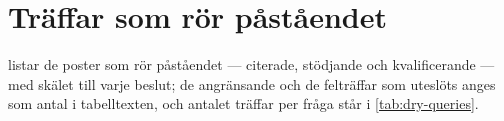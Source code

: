 \section{Träffar som rör påståendet}
\label{sec:dry-traffar}

 listar de poster som rör påståendet --- citerade,
stödjande och kvalificerande --- med skälet till varje beslut; de
angränsande och de felträffar som uteslöts anges som antal i
tabelltexten, och antalet träffar per fråga står i \cref{tab:dry-queries}.

